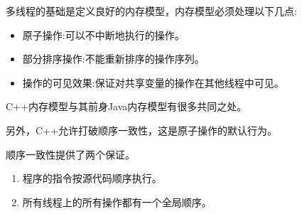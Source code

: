 多线程的基础是定义良好的内存模型，内存模型必须处理以下几点:

\begin{itemize}
\item 
原子操作:可以不中断地执行的操作。

\item 
部分排序操作:不能重新排序的操作序列。

\item 
操作的可见效果:保证对共享变量的操作在其他线程中可见。
\end{itemize}

C++内存模型与其前身Java内存模型有很多共同之处。

另外，C++允许打破顺序一致性，这是原子操作的默认行为。

顺序一致性提供了两个保证。

\begin{enumerate}
\item 
程序的指令按源代码顺序执行。

\item 
所有线程上的所有操作都有一个全局顺序。
\end{enumerate}















































